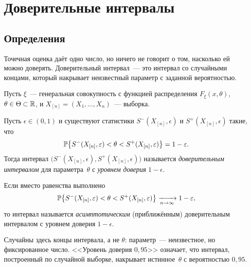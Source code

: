 \section{Доверительные интервалы}
\label{lec:08}

\subsection{Определения}
\label{lec08:definitions}

Точечная оценка даёт одно число, но ничего не говорит о том, насколько ей можно доверять.
Доверительный интервал~--- это интервал со случайными концами, который накрывает
неизвестный параметр с заданной вероятностью.

Пусть $\xi$~--- генеральная совокупность с функцией распределения $F_\xi(x, \theta)$,
$\theta \in \Th \subset \R$, и $X_{[n]} = (X_1, \ldots, X_n)$~--- выборка.

\begin{definition}
  Пусть $\epsilon \in (0, 1)$ и существуют статистики $S^-(X_{[n]}, \epsilon)$ и
  $S^+(X_{[n]}, \epsilon)$ такие, что
  \[
    \P\bigl\{S^-(X_{[n]}, \epsilon) < \theta < S^+(X_{[n]}, \epsilon)\bigr\} = 1 - \epsilon.
  \]
  Тогда интервал $\bigl(S^-(X_{[n]}, \epsilon), S^+(X_{[n]}, \epsilon)\bigr)$ называется
  \emph{доверительным интервалом} для параметра~$\theta$ с \emph{уровнем доверия} $1 - \epsilon$.
\end{definition}

\begin{definition}
  Если вместо равенства выполнено
  \[
    \P\bigl\{S^-(X_{[n]}, \epsilon) < \theta < S^+(X_{[n]}, \epsilon)\bigr\}
    \xrightarrow[n \to \infty]{} 1 - \epsilon,
  \]
  то интервал называется \emph{асимптотическим} (приближённым) доверительным интервалом
  с уровнем доверия $1 - \epsilon$.
\end{definition}

\begin{remark}
  Случайны здесь концы интервала, а не $\theta$: параметр~--- неизвестное, но фиксированное
  число. <<Уровень доверия $0{,}95$>> означает, что интервал, построенный по случайной выборке,
  накрывает истинное~$\theta$ с вероятностью $0{,}95$.
\end{remark}

